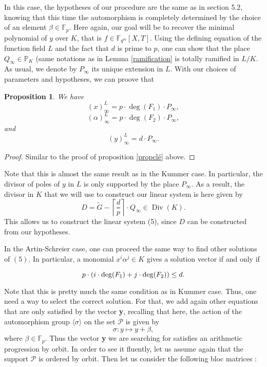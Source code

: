 \documentclass[10pt]{article}
\newtheorem{prop1}[thm]{Proposition}
\newcommand{\s}{\vspace{0.3cm}}
\newcommand{\cd}{\cdot}
\newcommand{\PP}{\mathbb{P}}
\newcommand{\fqm}{\mathbb{F}_{q^m}}
\newcommand{\PR}{\mathcal{P}}
\newcommand{\Div}{\operatorname{Div}}
\begin{document}
\s

In this case, the hypotheses of our procedure are the same as in section 5.2, knowing that this time the automorphism is completely determined by the choice of an element $\beta \in \mathbb{F}_p$. Here again, our goal will be to recover the minimal polynomial of $y$ over $K$, that is $f \in \fqm[X,T]$. Using the defining equation of the function field $L$ and the fact that $d$ is prime to $p$, one can show that the place $Q_{\infty} \in \PP_K$ (same notations as in Lemma \ref{ramification} is totally ramified in $L/K$. As usual, we denote by $P_{\infty}$ its unique extension in $L$. With our choices of parameters and hypotheses, we can proove that

\s

\begin{prop1} \label{propclé2}
We have
\[(x)^L_{\infty} = p \cd \deg(F_1) \cd P_{\infty},\]
\[(\alpha)^L_{\infty} = p \cd \deg(F_2) \cd P_{\infty},\]
and
\[(y)^L_{\infty} = d \cd P_{\infty}.\]
\end{prop1}

\s

\begin{proof}
Similar to the proof of proposition \ref{propclé} above.
\end{proof}

\s

Note that this is almost the same result as in the Kummer case. In particular, the divisor of poles of $y$ in $L$ is only supported by the place $P_{\infty}$. As a result, the divisor in $K$ that we will use to construct our linear system is here given by 
\[D = \tilde{G} - \left\lceil\frac{d}{p}\right\rceil \cd Q_{\infty} \in \Div(K).\]
This allows us to construct the linear system (5), since $D$ can be constructed from our hypotheses. 

\s

In the Artin-Schreier case, one can proceed the same way to find other solutions of $(5)$. In particular, a monomial $x^i\alpha^j \in K$ gives a solution vector if and only if 

\[p \cd (i \cd \deg(F_1)+j \cd \deg(F_{\rm 2})) \leq d.\]

Note that this is pretty much the same condition as in Kummer case. Thus, one need a way to select the correct solution. For that, we add again other equations that are only satisfied by the vector \textbf{y}, recalling that here, the action of the automorphism group $\langle\sigma\rangle$ on the set $\PR$ is given by 
\[\sigma : y \longmapsto y + \beta,\]
where $\beta \in \mathbb{F}_p$. Thus the vector \textbf{y} we are searching for satisfies an arithmetic progression by orbit. In order to see it fluently, let us assume again that the support $\PR$ is ordered by orbit. Then let us consider the following bloc matrices :
\end{document}
